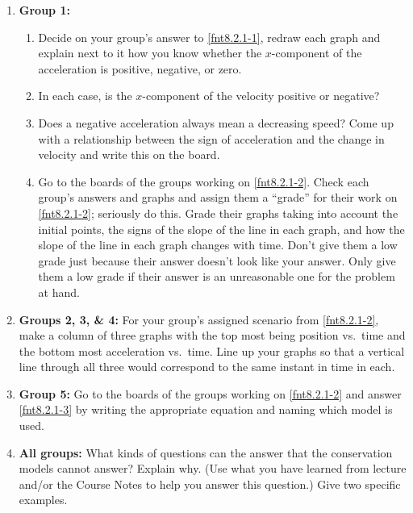 \begin{enumerate}
	\item \textbf{Group 1:}
	\begin{enumerate}
		\item Decide on your group's answer to \ref{fnt8.2.1-1}, redraw each graph and explain next to it how you know whether the $x$-component of the acceleration is positive, negative, or zero.
		\item In each case, is the $x$-component of the velocity positive or negative?
		\item Does a negative acceleration always mean a decreasing speed? Come up with a relationship between the sign of acceleration and the change in velocity and write this on the board.
		\item Go to the boards of the groups working on \ref{fnt8.2.1-2}. Check each group's answers and graphs and assign them a ``grade'' for their work on \ref{fnt8.2.1-2}; seriously do this. Grade their graphs taking into account the initial points, the signs of the slope of the line in each graph, and how the slope of the line in each graph changes with time. Don't give them a low grade just because their answer doesn't look like your answer. Only give them a low grade if their answer is an unreasonable one for the problem at hand.
	\end{enumerate}
	
	\item \textbf{Groups 2, 3, \& 4:} For your group's assigned scenario from \ref{fnt8.2.1-2}, make a column of three graphs with the top most being position vs.\ time and the bottom most acceleration vs.\ time. Line up your graphs so that a vertical line through all three would correspond to the same instant in time in each.
	
	\item \textbf{Group 5:} Go to the boards of the groups working on \ref{fnt8.2.1-2} and answer \ref{fnt8.2.1-3} by writing the appropriate equation and naming which model is used.
	
	\item \textbf{All groups:} What kinds of questions can the \FModel{} answer that the conservation models cannot answer? Explain why. (Use what you have learned from lecture and/or the Course Notes to help you answer this question.) Give two specific examples.
\end{enumerate}

\WCD
